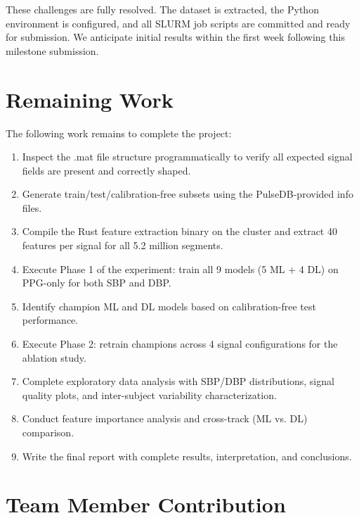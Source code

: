 \documentclass[11pt]{article}
\begin{document}
These challenges are fully resolved. The dataset is extracted, the Python environment is configured, and all SLURM job scripts are committed and ready for submission. We anticipate initial results within the first week following this milestone submission.

\section{Remaining Work}

The following work remains to complete the project:

\begin{enumerate}[nosep]
    \item Inspect the .mat file structure programmatically to verify all expected signal fields are present and correctly shaped.
    \item Generate train/test/calibration-free subsets using the PulseDB-provided info files.
    \item Compile the Rust feature extraction binary on the cluster and extract 40 features per signal for all 5.2 million segments.
    \item Execute Phase 1 of the experiment: train all 9 models (5 ML + 4 DL) on PPG-only for both SBP and DBP.
    \item Identify champion ML and DL models based on calibration-free test performance.
    \item Execute Phase 2: retrain champions across 4 signal configurations for the ablation study.
    \item Complete exploratory data analysis with SBP/DBP distributions, signal quality plots, and inter-subject variability characterization.
    \item Conduct feature importance analysis and cross-track (ML vs. DL) comparison.
    \item Write the final report with complete results, interpretation, and conclusions.
\end{enumerate}

\section{Team Member Contribution}
\end{document}
